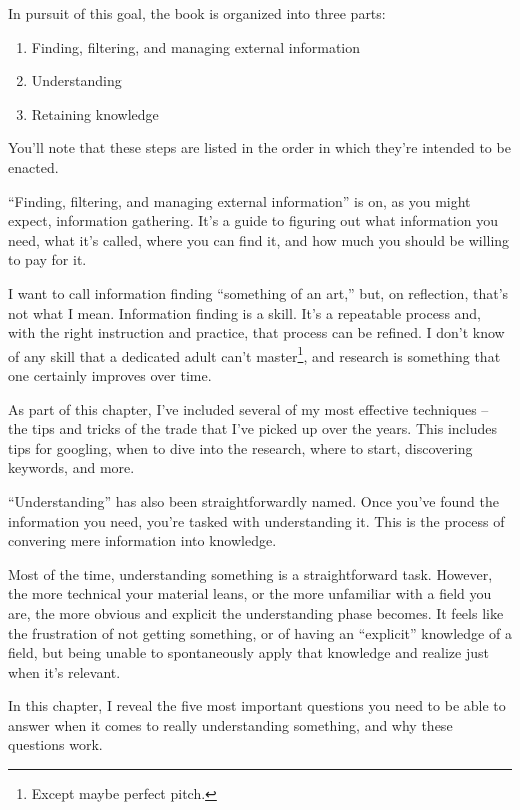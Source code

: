 In pursuit of this goal, the book is organized into three parts:

\begin{enumerate}
  \item Finding, filtering, and managing external information
  \item Understanding
  \item Retaining knowledge
\end{enumerate}

You'll note that these steps are listed in the order in which they're intended to be enacted.

 ``Finding, filtering, and managing external
  information'' is on, as you might expect, information gathering. It's a guide
to figuring out what information you need, what it's called, where you can find
it, and how much you should be willing to pay for it.

I want to call information finding ``something of an art,'' but, on reflection,
that's not what I mean. Information finding is a skill. It's a repeatable
process and, with the right instruction and practice, that process can be
refined. I don't know of any skill that a dedicated adult can't
master\footnote{Except maybe perfect pitch.}, and research is something
that one certainly improves over time.

As part of this chapter, I've included several of my most effective techniques
-- the tips and tricks of the trade that I've picked up over the years. This
includes tips for googling, when to dive into the research, where to start,
discovering keywords, and more.

 ``Understanding'' has also been straightforwardly
named. Once you've found the information you need, you're tasked with
understanding it. This is the process of convering mere information into
knowledge.

Most of the time, understanding something is a straightforward task. However,
the more technical your material leans, or the more unfamiliar with a field you
are, the more obvious and explicit the understanding phase becomes. It feels
like the frustration of not getting something, or of having an ``explicit''
knowledge of a field, but being unable to spontaneously apply that knowledge and
realize just when it's relevant.

In this chapter, I reveal the five most important questions you need to be able to
answer when it comes to really understanding something, and why these questions
work.


